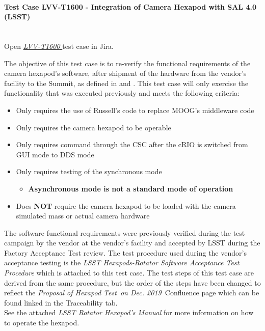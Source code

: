 \documentclass[SE,lsstdraft,STR,toc]{lsstdoc}
\providecommand{\tightlist}{
  \setlength{\itemsep}{0pt}\setlength{\parskip}{0pt}}
\begin{document}
\paragraph{Test Case LVV-T1600 - Integration of Camera Hexapod with SAL 4.0 (LSST)
 }\mbox{}\\

Open  \href{https://jira.lsstcorp.org/secure/Tests.jspa#/testCase/LVV-T1600}{\textit{ LVV-T1600 } }
test case in Jira.

The objective of this test case is to re-verify the functional
requirements of the camera hexapod's software, after shipment of the
hardware from the vendor's facility to the Summit, as defined in 
and . This test case will only exercise the functionality that
was executed previously and meets the following criteria:

\begin{itemize}
\tightlist
\item
  Only requires the use of Russell's code to replace MOOG's middleware
  code
\item
  Only requires the camera hexapod to be operable
\item
  Only requires command through the CSC after the cRIO is switched from
  GUI mode to DDS mode
\item
  Only requires testing of the synchronous mode

  \begin{itemize}
  \tightlist
  \item
    \textbf{Asynchronous mode is not a standard mode of operation}
  \end{itemize}
\item
  Does \textbf{NOT} require the camera hexapod to be loaded with the
  camera simulated mass or actual camera hardware
\end{itemize}

The software functional requirements were previously verified during the
test campaign by the vendor at the vendor's facility and accepted by
LSST during the Factory Acceptance Test review. The test procedure used
during the vendor's acceptance testing is the \emph{LSST
Hexapods-Rotator Software Acceptance Test Procedure} which is attached
to this test case. The test steps of this test case are derived from the
same procedure, but the order of the steps have been changed to reflect
the \emph{Proposal of Hexapod Test~on Dec. 2019~}Confluence page which
can be found linked in the Traceability tab.\\[2\baselineskip]See the
attached \emph{LSST Rotator Hexapod's Manual} for more information on
how to operate the hexapod.
\end{document}
